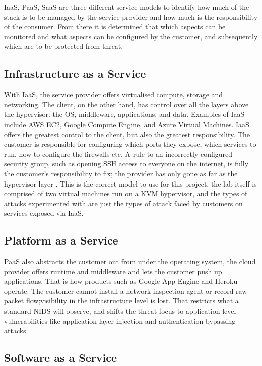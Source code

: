 IaaS, PaaS, SaaS are three different service models to identify how much of the stack is to be managed by the service provider and how much is the responsibility of the consumer. From there it is determined that which aspects can be monitored and what aspects can be configured by the customer, and subsequently which are to be protected from threat.

\subsection{Infrastructure as a Service}

With IaaS, the service provider offers virtualised compute, storage and networking. The client, on the other hand, has control over all the layers above the hypervisor: the OS, middleware, applications, and data. Examples of IaaS include AWS EC2, Google Compute Engine, and Azure Virtual Machines.
IaaS offers the greatest control to the client, but also the greatest responsibility. The customer is responsible for configuring which ports they expose, which services to run, how to configure the firewalls etc. A rule to an incorrectly configured security group, such as opening SSH access to everyone on the internet, is fully the customer's responsibility to fix; the provider has only gone as far as the hypervisor layer \cite{nist2011architecture}. This is the correct model to use for this project, the lab itself is comprised of two virtual machines run on a KVM hypervisor, and the types of attacks experimented with are just the types of attack faced by customers on services exposed via IaaS.

\subsection{Platform as a Service}

\ac{PaaS} also abstracts the customer out from under the operating system, the cloud provider offers runtime and middleware and lets the customer push up applications. That is how products such as Google App Engine and Heroku operate. The customer cannot install a network inspection agent or record raw packet flow;visibility in the infrastructure level is lost. That restricts what a standard NIDS will observe, and shifts the threat focus to application-level vulnerabilities like application layer injection and authentication bypassing attacks.

\subsection{Software as a Service}

